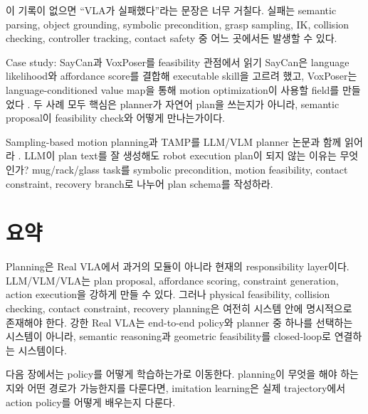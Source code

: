 이 기록이 없으면 ``VLA가 실패했다''라는 문장은 너무 거칠다. 실패는 semantic parsing, object grounding, symbolic precondition, grasp sampling, IK, collision checking, controller tracking, contact safety 중 어느 곳에서든 발생할 수 있다.

\begin{casebox}{Case study: SayCan과 VoxPoser를 feasibility 관점에서 읽기}
SayCan은 language likelihood와 affordance score를 결합해 executable skill을 고르려 했고, VoxPoser는 language-conditioned value map을 통해 motion optimization이 사용할 field를 만들었다 \cite{saycan2022,voxposer2023}. 두 사례 모두 핵심은 planner가 자연어 plan을 쓰는지가 아니라, semantic proposal이 feasibility check와 어떻게 만나는가이다.
\end{casebox}

\chapterwork
{Sampling-based motion planning과 TAMP를 LLM/VLM planner 논문과 함께 읽어라 \cite{lavalle2006,kavraki1996,lavalle2001rrt,kaelbling2011tamp}.}
{LLM이 plan text를 잘 생성해도 robot execution plan이 되지 않는 이유는 무엇인가?}
{mug/rack/glass task를 symbolic precondition, motion feasibility, contact constraint, recovery branch로 나누어 plan schema를 작성하라.}

\section{요약}

Planning은 Real VLA에서 과거의 모듈이 아니라 현재의 responsibility layer이다. LLM/VLM/VLA는 plan proposal, affordance scoring, constraint generation, action execution을 강하게 만들 수 있다. 그러나 physical feasibility, collision checking, contact constraint, recovery planning은 여전히 시스템 안에 명시적으로 존재해야 한다. 강한 Real VLA는 end-to-end policy와 planner 중 하나를 선택하는 시스템이 아니라, semantic reasoning과 geometric feasibility를 closed-loop로 연결하는 시스템이다.

다음 장에서는 policy를 어떻게 학습하는가로 이동한다. planning이 무엇을 해야 하는지와 어떤 경로가 가능한지를 다룬다면, imitation learning은 실제 trajectory에서 action policy를 어떻게 배우는지 다룬다.
